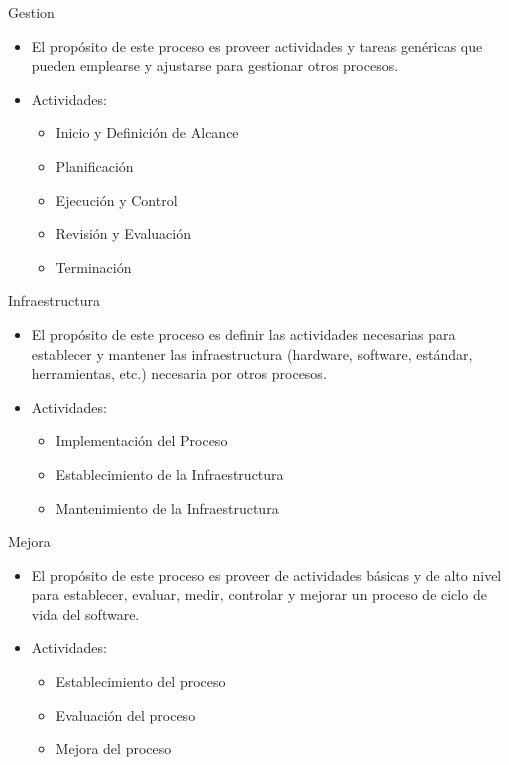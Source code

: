 \documentclass{beamer}
\begin{document}
			\begin{frame}{Gestion}
				\begin{itemize}
					\item El propósito de este proceso es proveer actividades y tareas genéricas que pueden emplearse y ajustarse para gestionar otros procesos.
					\item Actividades:
					
					\begin{itemize}
						\item Inicio y Definición de Alcance
						\item Planificación
						\item Ejecución y Control
						\item Revisión y Evaluación
						\item Terminación
					\end{itemize}
				\end{itemize}
			\end{frame}
			
			\begin{frame}{Infraestructura}
				\begin{itemize}
					\item El propósito de este proceso es definir las actividades necesarias para establecer y mantener las infraestructura (hardware, software, estándar, herramientas, etc.) necesaria por otros procesos.
					\item Actividades:
					
					\begin{itemize}
						\item Implementación del Proceso
						\item Establecimiento de la Infraestructura
						\item Mantenimiento de la Infraestructura
					\end{itemize}

				\end{itemize}
			\end{frame}
			
			\begin{frame}{Mejora}
				\begin{itemize}
					\item El propósito de este proceso es proveer de actividades básicas y de alto nivel para establecer, evaluar, medir, controlar y mejorar un proceso de ciclo de vida del software.
					\item Actividades:
					\begin{itemize}
						\item Establecimiento del proceso
						\item Evaluación del proceso
						\item Mejora del proceso
					\end{itemize}
				\end{itemize}
			\end{frame}
			
\end{document}

